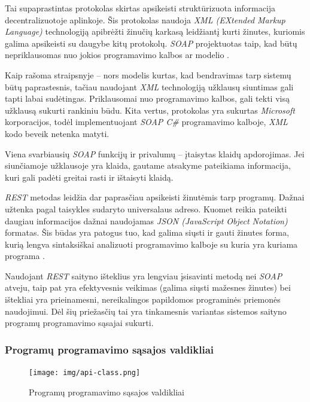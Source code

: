 \documentclass{VUMIFPSkursinis}
\begin{document}

Tai supaprastintas protokolas skirtas apsikeisti struktūrizuota informacija decentralizuotoje aplinkoje. Šis protokolas naudoja \textit{XML (EXtended Markup Language)} technologiją apibrėžti žinučių karkasą leidžiantį kurti žinutes, kuriomis galima apsikeisti su daugybe kitų protokolų. \textit{SOAP} projektuotas taip, kad būtų nepriklausomas nuo jokios programavimo kalbos ar modelio \cite{SoapDocs}.

Kaip rašoma straipsnyje \cite{SoapRest} – nors modelis kurtas, kad bendravimas tarp sistemų būtų paprastesnis, tačiau naudojant \textit{XML} technologiją užklausų siuntimas gali tapti labai sudėtingas. Priklausomai nuo programavimo kalbos, gali tekti visą užklausą sukurti rankiniu būdu. Kita vertus, protokolas yra sukurtas \textit{Microsoft} korporacijos, todėl implementuojant \textit{SOAP C\#} programavimo kalboje, \textit{XML} kodo beveik netenka matyti.

Viena svarbiausių \textit{SOAP} funkcijų ir privalumų – įtaisytas klaidų apdorojimas. Jei siunčiamoje užklausoje yra klaida, gautame atsakyme pateikiama informacija, kuri gali padėti greitai rasti ir ištaisyti klaidą.


\textit{REST} metodas leidžia dar paprasčiau apsikeisti žinutėmis tarp programų. Dažnai užtenka pagal taisykles sudaryto universalaus adreso. Kuomet reikia pateikti daugiau informacijos dažnai naudojamas \textit{JSON (JavaScript Object Notation)} formatas. Šis būdas yra patogus tuo, kad galima siųsti ir gauti žinutes forma, kurią lengva sintaksiškai analizuoti programavimo kalboje su kuria yra kuriama programa \cite{SoapRest}.

Naudojant \textit{REST} saityno išteklius yra lengviau įsisavinti metodą nei \textit{SOAP} atveju, taip pat yra efektyvesnis veikimas (galima siųsti mažesnes žinutes) bei ištekliai yra prieinamesni, nereikalingos papildomos programinės priemonės naudojimui. Dėl šių priežasčių tai yra tinkamesnis variantas sistemos saityno programų programavimo sąsajai sukurti.

\subsubsection{Programų programavimo sąsajos valdikliai}

\begin{figure}[H]
	\centering
	\texttt{[image: img/api-class.png]}
	\caption{Programų programavimo sąsajos valdikliai}
	\label{img:api-class-diagram}
\end{figure}
\end{document}

